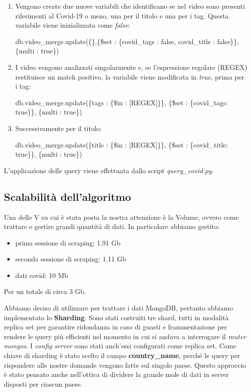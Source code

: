 \documentclass[10pt, a4paper,openany]{article}
\begin{document}
	\begin{enumerate}
		\item Vengono create due nuove variabili che identificano se nel video sono presenti riferimenti al Covid-19 o meno, una per il titolo e una per i tag. Questa variabile viene inizializzata come \textit{false}:
		
			db.video\_merge.update(\{\},\{\$set : \{covid\_tags : false, covid\_title : false\}\},\{multi : true\})
		
		\item I video vengono analizzati singolarmente e, se l'espressione regolare (REGEX) restituisce un match positivo, la variabile viene modificata in \textit{true}, prima per i tag:
		
			db.video\_merge.update(\{tags : \{\$in : [REGEX]\}\}, \{\$set : \{covid\_tags: true\}\}, \{multi : true\})
		
		\item Successivamente per il titolo:
		
			db.video\_merge.update(\{title : \{\$in : [REGEX]\}\}, \{\$set : \{covid\_title: true\}\}, \{multi : true\})
	\end{enumerate}
	L'applicazione delle query viene effettuata dallo script \textit{query\_covid.py}.
	
\subsection*{Scalabilità dell'algoritmo}

Una delle V su cui è stata posta la nostra attenzione è la Volume, ovvero come trattare e gestire grandi quantità di dati. 
In particolare abbiamo gestito:
\begin{itemize}
	\item prima sessione di scraping: 1.91 Gb
	\item seconda sessione di scraping: 1.11 Gb
	\item dati covid: 10 Mb
\end{itemize}
Per un totale di circa 3 Gb.

Abbiamo deciso di utilizzare per trattare i dati MongoDB, pertanto abbiamo implementato lo \textbf{Sharding}.
Sono stati costruiti tre shard, tutti in modalità replica set per garantire ridondanza in caso di guasti e frammentazione per rendere le query più efficienti nel momento in cui si andava a interrogare il \textit{router mongos}. I \textit{config server} sono stati anch'essi configurati come replica set. Come chiave di sharding è stato scelto il campo \textbf{country\_name}, perché le query per rispondere alle nostre domande vengono fatte sul singolo paese. Questo approccio è stato pensato anche nell'ottica di dividere la grande mole di dati in server disposti per ciascun paese. 
\end{document}
